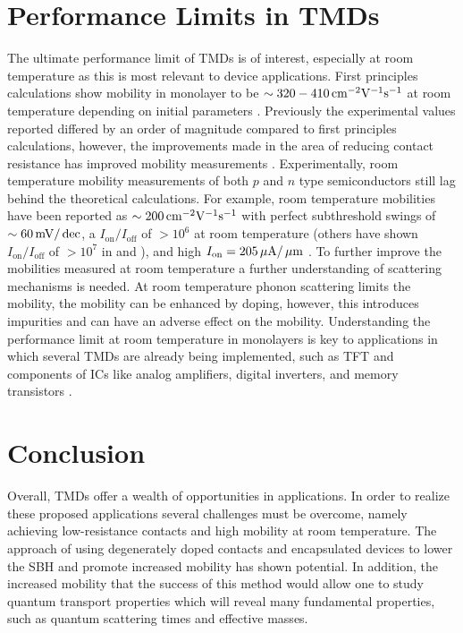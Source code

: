 \section{Performance Limits in \acp{TMD}}\label{sec:performance_limits}
The ultimate performance limit of \acp{TMD} is of interest, especially at room temperature as this is most relevant to device applications. 
First principles calculations show mobility in monolayer  to be $\sim 320-410\,\mathrm{cm}^{-2}\mathrm{V}^{-1}\mathrm{s}^{-1}$ at room temperature depending on initial parameters \cite{Li_PhysRevB2013,Kaasbjerg_PhysRevB2012}. Previously the experimental values reported differed by an order of magnitude compared to first principles calculations, however, the improvements made in the area of reducing contact resistance has improved mobility measurements \cite{Radisavljevic_NatureNano2011,Kappera_APLmat2014}. Experimentally, room temperature mobility measurements of both $p$ and $n$ type semiconductors still lag behind the theoretical calculations. For example,  room temperature mobilities have been reported as $\sim 200\,\mathrm{cm}^{-2}\mathrm{V}^{-1}\mathrm{s}^{-1}$ with perfect subthreshold swings of $\sim 60\,\mathrm{mV}/\,\mathrm{dec}$, a $I_\mathrm{on}/I_\mathrm{off}$ of $> 10^6$ at room temperature (others have shown $I_\mathrm{on}/I_\mathrm{off}$ of $> 10^7$ in  and ), and high $I_\mathrm{on} = 205\,\mathrm{\mu A}/\,\mathrm{\mu m}$ \cite{Fang_NanoLett2012,Liu_NanoLett2013,Kappera_NatureMat2014,Das_NanoLett2014}.  To further improve the mobilities measured at room temperature a further understanding of scattering mechanisms is needed. At room temperature phonon scattering limits the mobility, the mobility can be enhanced by doping, however, this introduces impurities and can have an adverse effect on the mobility. Understanding the performance limit at room temperature in monolayers is key to applications in which several \acp{TMD} are already being implemented, such as \ac{TFT} and components of \acp{IC} like analog amplifiers, digital inverters, and memory transistors \cite{Bhimanapati_ACSnano2015}.

\section{Conclusion}\label{sec:conclusion}
Overall, \acp{TMD} offer a wealth of opportunities in applications. In order to realize these proposed applications several challenges must be overcome, namely achieving low-resistance contacts and high mobility at room temperature. The approach of using degenerately doped contacts and \hbn encapsulated devices to lower the \acs{SBH} and promote increased mobility has shown potential. In addition, the increased mobility that the success of this method would allow one to study quantum transport properties which will reveal many fundamental properties, such as quantum scattering times and effective masses. 